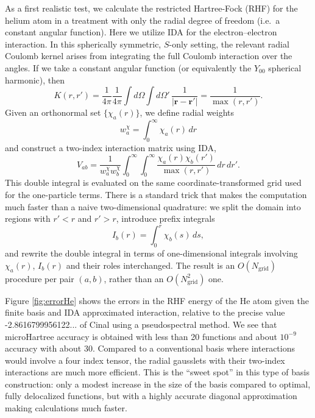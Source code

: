\documentclass[aps,pra,reprint,longbibliography,nofootinbib]{revtex4-2}
\begin{document}
As a first realistic test, we calculate the restricted Hartree-Fock (RHF)  for the helium atom in a  treatment with only the radial degree of freedom (i.e.\ a constant angular function). Here we utilize IDA  for the electron--electron interaction.  
In this spherically symmetric, $S$-only setting, the relevant radial Coulomb kernel arises from integrating the full Coulomb interaction over the angles. If we take a constant angular function (or equivalently the $Y_{00}$ spherical harmonic), then
\begin{equation}
K(r,r') = \frac{1}{4\pi}\frac{1}{4\pi}
\int d\Omega \int d\Omega'\,\frac{1}{|\mathbf r - \mathbf r'|}
= \frac{1}{\max(r,r')}.
\end{equation}
Given an orthonormal set $\{\chi_a(r)\}$, we define radial weights
\begin{equation}
w_a^\chi = \int_0^\infty \chi_a(r)\,dr
\end{equation}
and construct a two-index interaction matrix using IDA,
\begin{equation}
V_{ab}
= \frac{1}{w_a^\chi w_b^\chi}
\int_0^\infty\!\!\int_0^\infty
\frac{\chi_a(r)\chi_b(r')}{\max(r,r')}\,dr\,dr'.
\end{equation}
This double integral is evaluated on the same coordinate-transformed grid used for the one-particle terms. There is a standard trick that makes the computation much faster than a naive two-dimensional quadrature: we split the domain into regions with $r' < r$ and $r' > r$, introduce prefix integrals
\begin{equation}
I_b(r) = \int_0^r \chi_b(s)\,ds,
\end{equation}
and rewrite the double integral in terms of one-dimensional integrals involving $\chi_a(r)$, $I_b(r)$ and their roles interchanged. The result is an $O(N_{\mathrm{grid}})$ procedure per pair $(a,b)$, rather than an $O(N_{\mathrm{grid}}^2)$ one.

Figure \ref{fig:errorHe} shows the errors in the RHF energy of the He atom given the finite basis and IDA approximated interaction, relative to the precise value -2.8616799956122... of Cinal\cite{Cinal2020} using a pseudospectral method.
We see that microHartree accuracy is obtained with less than 20 functions and about $10^{-9}$ accuracy with about 30.  Compared to a conventional basis where interactions would involve a four index tensor, the radial gausslets with their two-index interactions are much more efficient. This is the ``sweet spot'' in this type of basis construction: only a modest increase in the size of the basis compared to optimal, fully delocalized functions, but with a highly accurate diagonal approximation making calculations much faster. 
\end{document}
